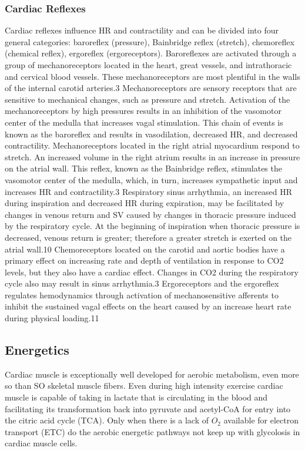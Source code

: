 \subsubsection{Cardiac Reflexes} %
Cardiac reflexes influence HR and contractility and can be divided into four general categories: baroreflex (pressure), Bainbridge reflex (stretch), chemoreflex (chemical reflex), ergoreflex (ergoreceptors). 
Baroreflexes are activated through a group of mechanoreceptors located in the heart, great vessels, and intrathoracic and cervical blood vessels. These mechanoreceptors are most plentiful in the walls of the internal carotid arteries.3 Mechanoreceptors are sensory receptors that are sensitive to mechanical changes, such as pressure and stretch. Activation of the mechanoreceptors by high pressures results in an inhibition of the vasomotor center of the medulla that increases vagal stimulation. This chain of events is known as the baroreflex and results in vasodilation, decreased HR, and decreased contractility.
Mechanoreceptors located in the right atrial myocardium respond to stretch. An increased volume in the right atrium results in an increase in pressure on the atrial wall. This reflex, known as the Bainbridge reflex, stimulates the vasomotor center of the medulla, which, in turn, increases sympathetic input and increases HR and contractility.3 Respiratory sinus arrhythmia, an increased HR during inspiration and decreased HR during expiration, may be facilitated by changes in venous return and SV caused by changes in thoracic pressure induced by the respiratory cycle. At the beginning of inspiration when thoracic pressure is decreased, venous return is greater; therefore a greater stretch is exerted on the atrial wall.10
Chemoreceptors located on the carotid and aortic bodies have a primary effect on increasing rate and depth of ventilation in response to CO2 levels, but they also have a cardiac effect. Changes in CO2 during the respiratory cycle also may result in sinus arrhythmia.3
Ergoreceptors and the ergoreflex regulates hemodynamics through activation of mechanosensitive afferents to inhibit the sustained vagal effects on the heart caused by an increase heart rate during physical loading.11


\subsection{Energetics}

Cardiac muscle is exceptionally well developed for aerobic metabolism, even more so than SO skeletal muscle fibers. Even during high intensity exercise cardiac muscle is capable of taking in lactate that is circulating in the blood and facilitating its transformation back into pyruvate and acetyl-CoA for entry into the citric acid cycle (TCA). Only when there is a lack of $O_2$ available for electron transport (ETC) do the aerobic energetic pathways not keep up with glycolosis in cardiac muscle cells. 

